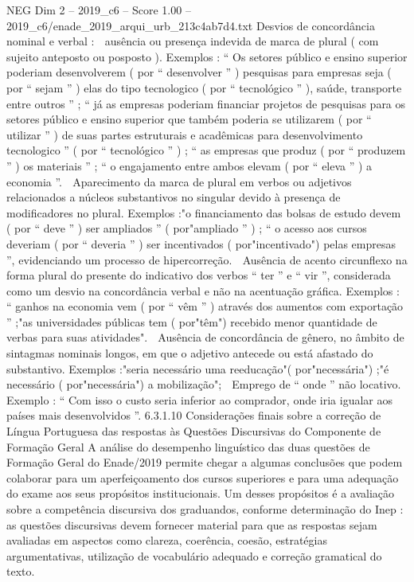 \begin{textsample}{NEG Dim 2 – 2019\_c6 – Score 1.00 – 2019\_c6/enade\_2019\_arqui\_urb\_213c4ab7d4.txt}
Desvios de concordância nominal e verbal :  ausência ou presença indevida de marca de plural ( com sujeito anteposto ou posposto ).
Exemplos : “ Os setores público e ensino superior poderiam desenvolverem ( por “ desenvolver ” ) pesquisas para empresas seja ( por “ sejam ” ) elas do tipo tecnologico ( por “ tecnológico ” ), saúde, transporte entre outros ” ; “ já as empresas poderiam financiar projetos de pesquisas para os setores público e ensino superior que também poderia se utilizarem ( por “ utilizar ” ) de suas partes estruturais e acadêmicas para desenvolvimento tecnologico ” ( por “ tecnológico ” ) ; “ as empresas que produz ( por “ produzem ” ) os materiais ” ; “ o engajamento entre ambos elevam ( por “ eleva ” ) a economia ”.  Aparecimento da marca de plural em verbos ou adjetivos relacionados a núcleos substantivos no singular devido à presença de modificadores no plural.
Exemplos :"o financiamento das bolsas de estudo devem ( por “ deve ” ) ser ampliados ” ( por"ampliado ” ) ; “ o acesso aos cursos deveriam ( por “ deveria ” ) ser incentivados ( por"incentivado") pelas empresas ”, evidenciando um processo de hipercorreção.  Ausência de acento circunflexo na forma plural do presente do indicativo dos verbos “ ter ” e “ vir ”, considerada como um desvio na concordância verbal e não na acentuação gráfica.
Exemplos : “ ganhos na economia vem ( por “ vêm ” ) através dos aumentos com exportação ” ;"as universidades públicas tem ( por"têm") recebido menor quantidade de verbas para suas atividades".  Ausência de concordância de gênero, no âmbito de sintagmas nominais longos, em que o adjetivo antecede ou está afastado do substantivo.
Exemplos :"seria necessário uma reeducação"( por"necessária") ;"é necessário ( por"necessária") a mobilização";  Emprego de “ onde ” não locativo.
Exemplo : “ Com isso o custo seria inferior ao comprador, onde iria igualar aos países mais desenvolvidos ”. 6.3.1.10 Considerações finais sobre a correção de Língua Portuguesa das respostas às Questões Discursivas do Componente de Formação Geral A análise do desempenho linguístico das duas questões de Formação Geral do Enade/2019 permite chegar a algumas conclusões que podem colaborar para um aperfeiçoamento dos cursos superiores e para uma adequação do exame aos seus propósitos institucionais.
Um desses propósitos é a avaliação sobre a competência discursiva dos graduandos, conforme determinação do Inep : as questões discursivas devem fornecer material para que as respostas sejam avaliadas em aspectos como clareza, coerência, coesão, estratégias argumentativas, utilização de vocabulário adequado e correção gramatical do texto.

\end{textsample}
